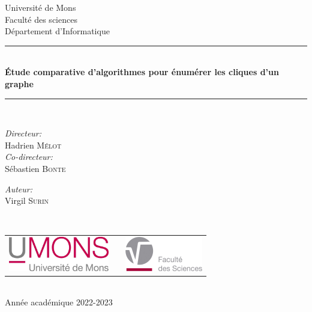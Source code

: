 \documentclass[12pt,a4paper]{article}
\begin{document}
\begin{titlepage}
  \begin{center}

    {\Large Université de Mons}\\[1ex]
    {\Large Faculté des sciences}\\[1ex]
    {\Large Département d'Informatique}\\[2.5cm]

    \newcommand{\HRule}{\rule{\linewidth}{0.3mm}}
    \HRule \\[0.3cm]
    { \LARGE \bfseries Étude comparative d'algorithmes pour énumérer les cliques d'un graphe \\[0.3cm]}
    \HRule \\[1.5cm]

    \begin{minipage}[t]{0.45\textwidth}
      \begin{flushleft} \large
        \emph{Directeur:}\\
        Hadrien \textsc{Mélot}\\
        \emph{Co-directeur:}\\
        Sébastien \textsc{Bonte}\\
      \end{flushleft}
    \end{minipage}
    \begin{minipage}[t]{0.45\textwidth}
      \begin{flushright} \large
        \emph{Auteur:} \\
        Virgil \textsc{Surin}
      \end{flushright}
    \end{minipage}\\[2ex]

    \vfill

    \begin{center}
      \begin{tabular}[t]{c c c}
        \includegraphics[height=1.5cm]{logoumons.jpg} &
                                                        \hspace{0.3cm} &
                                                                         \includegraphics[height=1.5cm]{logofs.jpg}
      \end{tabular}
    \end{center}~\\

    {\large Année académique 2022-2023}

  \end{center}
\end{titlepage}
\end{document}
